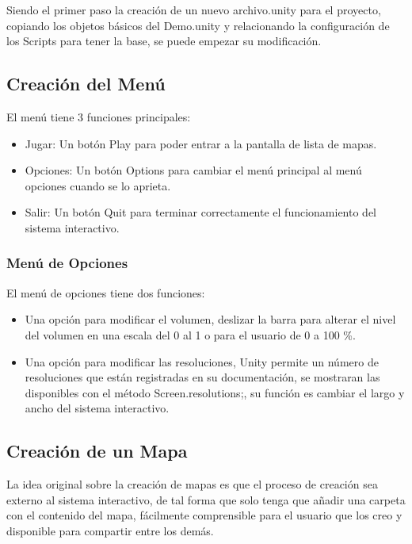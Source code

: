 Siendo el primer paso la creación de un nuevo archivo.unity para el proyecto, copiando los objetos básicos del Demo.unity y relacionando la configuración de los Scripts para tener la base, se puede empezar su modificación.


\subsection{Creación del Menú}

El menú tiene 3 funciones principales:

\begin{itemize}
	\item Jugar: Un botón Play para poder entrar a la pantalla de lista de mapas.
	\item Opciones: Un botón Options para cambiar el menú principal al menú opciones cuando se lo aprieta.
	\item Salir: Un botón Quit para terminar correctamente el funcionamiento del sistema interactivo.
\end{itemize}

\subsubsection{Menú de Opciones}

El menú de opciones tiene dos funciones:
\begin{itemize}
	\item Una opción para modificar el volumen, deslizar la barra para alterar el nivel del volumen en una escala del 0 al 1 o para el usuario de 0 a 100 \%.
	\item Una opción para modificar las resoluciones, Unity permite un número de resoluciones que están registradas en su documentación, se mostraran las disponibles con el método Screen.resolutions;, su función es cambiar el largo y ancho del sistema interactivo.
\end{itemize}

\subsection{Creación de un Mapa}

La idea original sobre la creación de mapas es que el proceso de creación sea externo al sistema interactivo, de tal forma que solo tenga que añadir una carpeta con el contenido del mapa, fácilmente comprensible para el usuario que los creo y disponible para compartir entre los demás.

